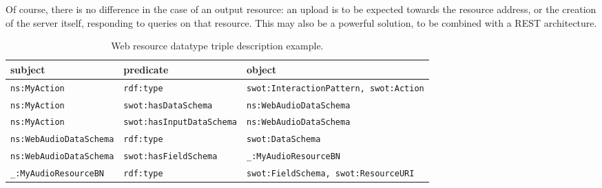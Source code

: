 Of course, there is no difference in the case of an output resource: an upload is to be expected towards the resource address, or the creation of the server itself, responding to queries on that resource. This may also be a powerful solution, to be combined with a REST architecture.

\begin{table*}[t]
\centering
\footnotesize
\caption{Web resource datatype triple description example.}
\label{tab:resource_datatype}
\begin{tabular}{lll}
\textbf{subject}           & \textbf{predicate}           & \textbf{object}           \\ \hline
\texttt{ns:MyAction}       & \texttt{rdf:type}            & \texttt{swot:InteractionPattern, swot:Action}  \\ \hline
\texttt{ns:MyAction}       & \texttt{swot:hasDataSchema}   & \texttt{ns:WebAudioDataSchema} \\ \hline
\texttt{ns:MyAction}       & \texttt{swot:hasInputDataSchema} & \texttt{ns:WebAudioDataSchema}  \\ \hline
\texttt{ns:WebAudioDataSchema}& \texttt{rdf:type}            & \texttt{swot:DataSchema}   \\ \hline
\texttt{ns:WebAudioDataSchema}& \texttt{swot:hasFieldSchema}  & \texttt{\_:MyAudioResourceBN} \\ \hline
\texttt{\_:MyAudioResourceBN} & \texttt{rdf:type}        & \texttt{swot:FieldSchema, swot:ResourceURI}\\ \hline
\end{tabular}
\end{table*}

